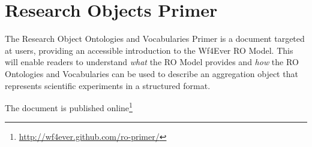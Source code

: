\section{Research Objects Primer}
\label{sec:primer}

The Research Object Ontologies and Vocabularies Primer is a document
targeted at users, providing an accessible introduction to the Wf4Ever
RO Model. This will enable readers to understand \emph{what} the RO Model
provides and \emph{how} the RO Ontologies and Vocabularies can be used to
describe an aggregation object that represents scientific experiments
in a structured format. 

The document is published online\footnote{\url{http://wf4ever.github.com/ro-primer/}}

